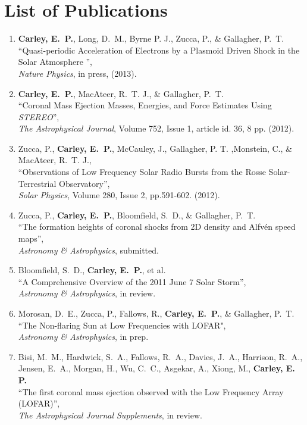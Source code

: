 \chapter{List of Publications}
\label{chapter:publications}


\begin{enumerate}

\item \textbf{Carley, E.~P.}, Long, D.~M., Byrne P. J., Zucca, P., \& Gallagher, P.~T.\\
``Quasi-periodic Acceleration of Electrons by a Plasmoid Driven Shock in the Solar Atmosphere '', \\
\emph{Nature Physics}, in press, (2013).

\item \textbf{Carley, E.~P.}, MacAteer, R.~T. J., \& Gallagher, P.~T.\\
``Coronal Mass Ejection Masses, Energies, and Force Estimates Using \emph{STEREO}'', \\
\emph{The Astrophysical Journal}, Volume 752, Issue 1, article id. 36, 8 pp. (2012).

\item Zucca, P., \textbf{Carley, E.~P.},  McCauley, J., Gallagher, P. T. ,Monstein, C., \& MacAteer, R.~T. J.,\\
``Observations of Low Frequency Solar Radio Bursts from the Rosse Solar-Terrestrial Observatory'', \\
\emph{Solar Physics}, Volume 280, Issue 2, pp.591-602. (2012).

\item Zucca, P., \textbf{Carley, E.~P.}, Bloomfield, S.~D., \& Gallagher, P.~T.\\
``The formation heights of coronal shocks from 2D density and Alfv\'{e}n speed maps'', \\
\emph{Astronomy \& Astrophysics}, submitted.

\item Bloomfield, S.~D., \textbf{Carley, E.~P.}, et al.\\
``A Comprehensive Overview of the 2011 June 7 Solar Storm'', \\
\emph{Astronomy \& Astrophysics}, in review.

\item Morosan, D.~E., Zucca, P., Fallows, R., \textbf{Carley, E.~P.}, \& Gallagher, P.~T.
``The Non-flaring Sun at Low Frequencies with LOFAR", \\
\emph{Astronomy \& Astrophysics}, in prep.

\item Bisi, M.~M., Hardwick, S.~A., Fallows, R.~A., Davies, J.~A., Harrison, R.~A., Jensen, E.~A., Morgan, H.,
Wu, C.~C., Asgekar, A.,  Xiong, M.,  {\bf Carley, E. P.} \\
``The first coronal mass ejection observed with the Low Frequency Array (LOFAR)'', \\
\emph{The Astrophysical Journal Supplements}, in review.

\end{enumerate}

